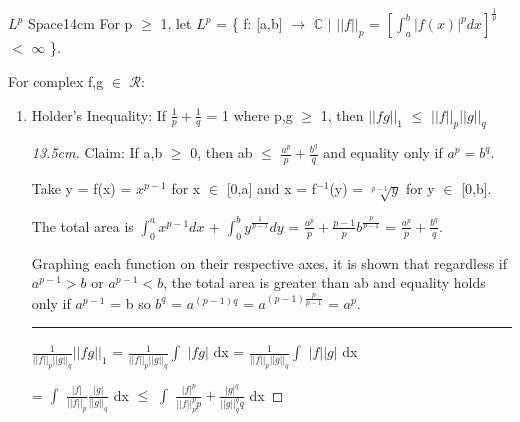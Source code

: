     \newpage



    \begin{definition}{$L^p$ Space}{14cm}
        For p $\geq$ 1, let $L^p$
        = \{ f: [a,b] $\rightarrow$ $\mathbb{C}$ {\color{lblue} $|$}
        $||f||_p$ = $[\int_a^b |f(x)|^p dx]^{\frac{1}{p}}$ $<$ $\infty$ \}.
    \end{definition}

    \vspace{0.2cm}

    \hspace{0.9cm}
    For complex f,g $\in$ $\mathscr{R}$:

    \begin{enumerate}[label=(\alph*), leftmargin=2cm, itemsep=0.1cm]
        \item {\color{lblue} Holder's Inequality}:        
            If $\frac{1}{p} + \frac{1}{q}$ = 1 where p,g $\geq$ 1, then
            $||fg||_1$ $\leq$ $||f||_p ||g||_q$        
    
            \begin{proof}[13.5cm]
                {\color{red} Claim}: If a,b $\geq$ 0,
                then ab $\leq$ $\frac{a^p}{p} + \frac{b^q}{q}$
                and equality only if $a^p = b^q$.
                
                Take y = f(x) = $x^{p-1}$ for x $\in$ [0,a]
                and x = f$^{-1}$(y) = $\sqrt[p-1]{y}$ for y $\in$ [0,b].

                The total area is
                $\int_0^a x^{p-1} dx$ + $\int_0^b y^{\frac{1}{p-1}} dy$
                = $\frac{a^p}{p} + \frac{p-1}{p}b^{\frac{p}{p-1}}$
                = $\frac{a^p}{p} + \frac{b^q}{q}$.

                Graphing each function on their respective axes,
                it is shown that regardless if $a^{p-1} > b$
                or $a^{p-1} < b$, the total area is greater than ab
                and equality holds only if $a^{p-1}$ = b
                so $b^q$ = $a^{(p-1)q}$ = $a^{(p-1)\frac{p}{p-1}}$ = $a^p$.

                \rule[0.1cm]{13.3cm}{0.01cm}

                \hspace{0.5cm}
                $\frac{1}{||f||_p ||g||_q} ||fg||_1$
                = $\frac{1}{||f||_p ||g||_q} \int$ $|f g|$ dx
                = $\frac{1}{||f||_p ||g||_q} \int$ $|f||g|$ dx

                \hspace{3.1cm}
                = $\int$ $\frac{|f|}{||f||_p} \frac{|g|}{||g||_q}$ dx
                $\leq$ $\int$ $\frac{|f|^p}{||f||_p^p p}
                                + \frac{|g|^q}{||g||_q^q q}$ dx


\end{proof}
\end{enumerate}
